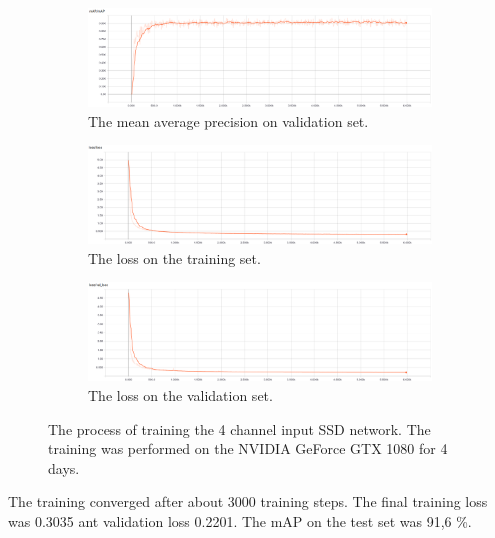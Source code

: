 \documentclass[a4paper,12pt,titlepage]{article}
\numberwithin{figure}{section}
\begin{document}
\begin{figure}[H]
    \begin{subfigure}[Sample1]{1\linewidth} 
    	\includegraphics[width=0.95\linewidth]{fig/ssd_rgbd/mAP.png}
        \caption{The mean average precision on validation set.}   
        \label{fig:ssd_mAP}
    \end{subfigure}
    \begin{subfigure}[Sample1]{1\linewidth} 
    	\includegraphics[width=0.95\linewidth]{fig/ssd_rgbd/loss.png}
        \caption{The loss on the training set.}   
        \label{fig:ssd_loss}
    \end{subfigure}    
	\begin{subfigure}[Sample1]{1\linewidth} 
    	\includegraphics[width=0.95\linewidth]{fig/ssd_rgbd/val_loss.png}
        \caption{The loss on the validation set.}   
        \label{fig:ssd_val_loss}
    \end{subfigure}    
    \caption{The process of training the 4 channel input SSD network. The training was performed on the NVIDIA GeForce GTX 1080 for 4 days.}
    \label{fig:ssd_training}
\end{figure}

The training converged after about 3000 training steps. The final training loss was 0.3035 ant validation loss 0.2201. The mAP on the test set was 91,6 \%.
\end{document}
